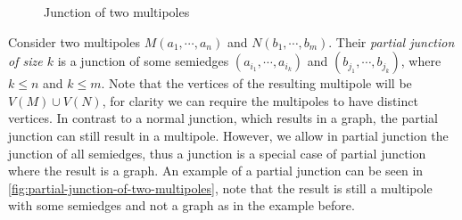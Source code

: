 \documentclass[12pt, twoside]{book}
\begin{document}
\begin{figure}
	\caption{Junction of two multipoles}
	\label{fig:junction-of-two-multipoles}
\end{figure}

Consider two multipoles $M(a_1,\cdots,a_n)$ and $N(b_1,\cdots,b_m)$. Their \textit{partial junction of size $k$} is a junction of some semiedges $(a_{i_1},\cdots, a_{i_k})$ and $(b_{j_1},\cdots, b_{j_k})$, where $k\leq n$ and $k\leq m$. Note that the vertices of the resulting multipole will be $V(M)\cup V(N)$, for clarity we can require the multipoles to have distinct vertices. In contrast to a normal junction, which results in a graph, the partial junction can still result in a multipole. However, we allow in partial junction the junction of all semiedges, thus a junction is a special case of partial junction where the result is a graph. An example of a partial junction can be seen in \cref{fig:partial-junction-of-two-multipoles}, note that the result is still a multipole with some semiedges and not a graph as in the example before.
\end{document}
